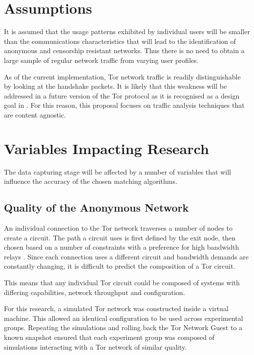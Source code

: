 \documentclass{ecuthesis}
\begin{document}
\section{Assumptions}

It is assumed that the usage patterns exhibited by individual users will be
smaller than the communications characteristics that will lead to the
identification of anonymous and censorship resistant networks. Thus there is no
need to obtain a large sample of regular network traffic from varying user
profiles.

As of the current implementation, Tor network traffic is readily
distinguishable by looking at the handshake packets. It is likely that this
weakness will be addressed in a future version of the Tor protocol as it is
recognised as a design goal in \textcite{Dingledine:2008p1542}. For this
reason, this proposal focuses on traffic analysis techniques that are content
agnostic.

\section{Variables Impacting Research}

The data capturing stage will be affected by a number of variables that will
influence the accuracy of the chosen matching algorithms.

\subsection{Quality of the Anonymous Network}

An individual connection to the Tor network traverses a number of nodes to
create a circuit. The path a circuit uses is first defined by the exit node,
then chosen based on a number of constraints with a preference for high
bandwidth relays \parencite{website:tor-path-selection}. Since each connection
uses a different circuit and bandwidth demands are constantly changing, it is
difficult to predict the composition of a Tor circuit.

This means that any individual Tor circuit could be composed of systems with
differing capabilities, network throughput and configuration.

For this research, a simulated Tor network was constructed inside a virtual
machine. This allowed an identical configuration to be used across experimental
groups. Repeating the simulations and rolling back the Tor Network Guest to a
known snapshot ensured that each experiment group was composed of simulations
interacting with a Tor network of similar quality.
\end{document}
